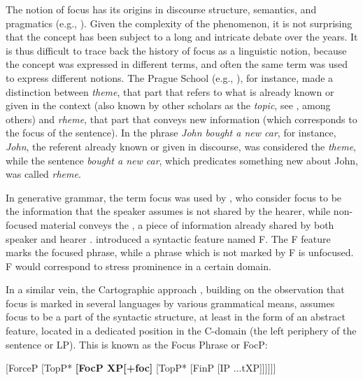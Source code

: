 The notion of focus has its origins in discourse structure, semantics, and pragmatics  (e.g., \cite{krifka2008basic, rooth1985association, rooth1992theory, schwarzschild1999givenness, von1990current}). Given the complexity of the phenomenon, it is not surprising that the concept has been subject to a long and intricate debate over the years. 
It is thus difficult to trace back the history of focus as a linguistic notion, because the concept was expressed in different terms, and often the same term was used to express different notions. The Prague School (e.g., \cite{mathesius1983functional, danevs1964three, firbas1971concept}), for instance, made a distinction between \textit{theme}, that part that refers to what is already known or given in the context (also known by other scholars as the \textit{topic}, see \cite{reinhart1981pragmatics, jacobs2001dimensions}, among others) and \textit{rheme}, that part that conveys new information (which corresponds to the focus of the sentence). In the phrase \textit{John bought a new car}, for instance, \textit{John}, the referent already known or given in discourse, was considered the \textit{theme}, while the sentence \textit{bought a new car}, which predicates something new about John, was called \textit{rheme}.

In generative grammar, the term focus was used by \cite{chomsky1970some, jackendoff1972semantic,brody1990some, rizzi1997fine}, who consider focus to be the information that the speaker assumes is not shared by the hearer, while non-focused material conveys the , a piece of information already shared by both speaker and hearer \parencite[2122]{frascarelli2010narrow}.  \textcite{jackendoff1972semantic} introduced a syntactic feature named F. The F feature marks the focused phrase, while a phrase which is not marked by F is unfocused. F would correspond to stress prominence in a certain domain. 
 
In a similar vein, the Cartographic approach \parencite{rizzi1997fine}, building on the observation that focus is marked in several languages by various grammatical means, assumes focus to be a part of the syntactic structure, at least in the form of an abstract feature, located in a dedicated position in the C-domain (the left periphery of the sentence or LP). This is known as the Focus Phrase or FocP:

\ea \label{ex:1:1}
 
{} [ForceP [TopP* \textbf{[FocP XP[+foc]} [TopP* [FinP [IP ...tXP]]]]]]\ \\
\z


